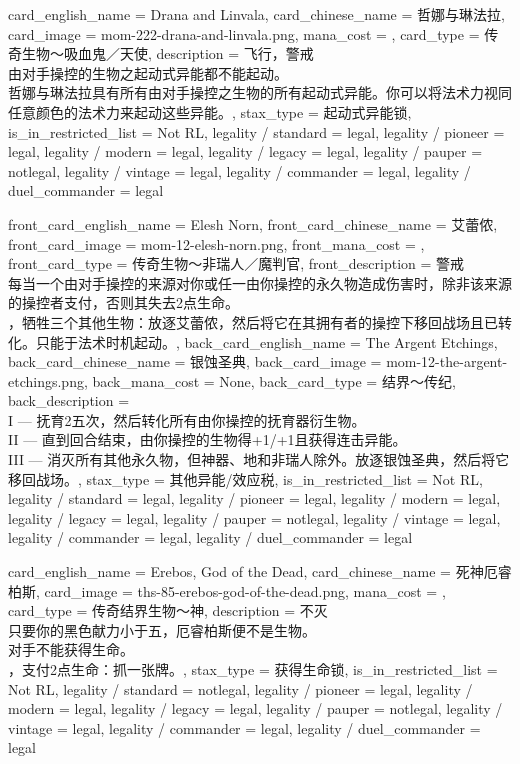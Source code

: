 \documentclass[lang = cn, color = black, 10pt]{AllThatStax}
\begin{document}
\card
{
	card_english_name = {Drana and Linvala},
	card_chinese_name = {哲娜与琳法拉},
	card_image = mom-222-drana-and-linvala.png,
	mana_cost = ,
	card_type = 传奇生物～吸血鬼／天使,
	description = {飞行，警戒\\
由对手操控的生物之起动式异能都不能起动。\\
哲娜与琳法拉具有所有由对手操控之生物的所有起动式异能。你可以将法术力视同任意颜色的法术力来起动这些异能。},
	stax_type = 起动式异能锁,
	is_in_restricted_list = Not RL,
	legality / standard = legal,
	legality / pioneer = legal,
	legality / modern = legal,
	legality / legacy = legal,
	legality / pauper = notlegal,
	legality / vintage = legal,
	legality / commander = legal,
	legality / duel_commander = legal
}

\mfcard
{
	front_card_english_name = {Elesh Norn},
	front_card_chinese_name = {艾蕾侬},
	front_card_image = mom-12-elesh-norn.png,
	front_mana_cost = ,
	front_card_type = 传奇生物～非瑞人／魔判官,
	front_description = {警戒\\
每当一个由对手操控的来源对你或任一由你操控的永久物造成伤害时，除非该来源的操控者支付，否则其失去2点生命。\\
，牺牲三个其他生物：放逐艾蕾侬，然后将它在其拥有者的操控下移回战场且已转化。只能于法术时机起动。},
	back_card_english_name = {The Argent Etchings},
	back_card_chinese_name = {银蚀圣典},
	back_card_image = mom-12-the-argent-etchings.png,
	back_mana_cost = None,
	back_card_type = 结界～传纪,
	back_description = {\\
I — 抚育2五次，然后转化所有由你操控的抚育器衍生物。\\
II — 直到回合结束，由你操控的生物得+1/+1且获得连击异能。\\
III — 消灭所有其他永久物，但神器、地和非瑞人除外。放逐银蚀圣典，然后将它移回战场。},
	stax_type = 其他异能/效应税,
	is_in_restricted_list = Not RL,
	legality / standard = legal,
	legality / pioneer = legal,
	legality / modern = legal,
	legality / legacy = legal,
	legality / pauper = notlegal,
	legality / vintage = legal,
	legality / commander = legal,
	legality / duel_commander = legal
}

\card
{
	card_english_name = {Erebos, God of the Dead},
	card_chinese_name = {死神厄睿柏斯},
	card_image = ths-85-erebos-god-of-the-dead.png,
	mana_cost = ,
	card_type = 传奇结界生物～神,
	description = {不灭\\
只要你的黑色献力小于五，厄睿柏斯便不是生物。\\
对手不能获得生命。\\
，支付2点生命：抓一张牌。},
	stax_type = 获得生命锁,
	is_in_restricted_list = Not RL,
	legality / standard = notlegal,
	legality / pioneer = legal,
	legality / modern = legal,
	legality / legacy = legal,
	legality / pauper = notlegal,
	legality / vintage = legal,
	legality / commander = legal,
	legality / duel_commander = legal
}
\end{document}
